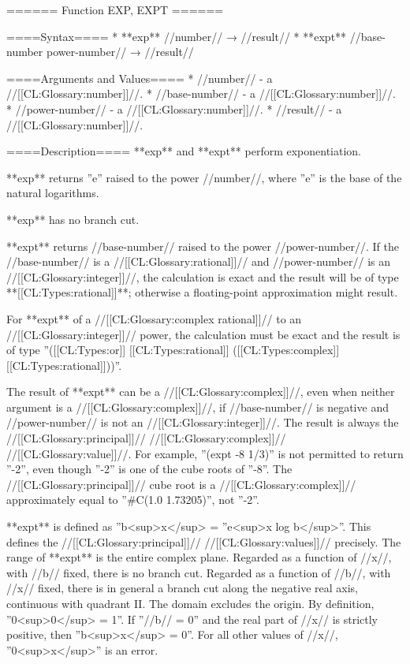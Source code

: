 ====== Function EXP, EXPT ======

====Syntax====
  * **exp** //number// → //result// 
  * **expt** //base-number power-number// → //result//

====Arguments and Values====
  * //number// - a //[[CL:Glossary:number]]//.
  * //base-number// - a //[[CL:Glossary:number]]//.
  * //power-number// - a //[[CL:Glossary:number]]//.
  * //result// - a //[[CL:Glossary:number]]//.

====Description====
**exp** and **expt** perform exponentiation.

**exp** returns ''e'' raised to the power //number//, where ''e'' is the base of the natural logarithms.

**exp** has no branch cut.

**expt** returns //base-number// raised to the power //power-number//. If the //base-number// is a //[[CL:Glossary:rational]]// and //power-number// is an //[[CL:Glossary:integer]]//, the calculation is exact and the result will be of type **[[CL:Types:rational]]**; otherwise a floating-point approximation might result.

For **expt** of a //[[CL:Glossary:complex rational]]// to an //[[CL:Glossary:integer]]// power, the calculation must be exact and the result is of type ''([[CL:Types:or]] [[CL:Types:rational]] ([[CL:Types:complex]] [[CL:Types:rational]]))''.

The result of **expt** can be a //[[CL:Glossary:complex]]//, even when neither argument is a //[[CL:Glossary:complex]]//, if //base-number// is negative and //power-number// is not an //[[CL:Glossary:integer]]//. The result is always the //[[CL:Glossary:principal]]// //[[CL:Glossary:complex]]// //[[CL:Glossary:value]]//. For example, ''(expt -8 1/3)'' is not permitted to return ''-2'', even though ''-2'' is one of the cube roots of ''-8''. The //[[CL:Glossary:principal]]// cube root is a //[[CL:Glossary:complex]]// approximately equal to ''#C(1.0 1.73205)'', not ''-2''.

**expt** is defined as ''b<sup>x</sup> = ''e<sup>x log b</sup>''. This defines the //[[CL:Glossary:principal]]// //[[CL:Glossary:values]]// precisely. The range of **expt** is the entire complex plane. Regarded as a function of //x//, with //b// fixed, there is no branch cut. Regarded as a function of //b//, with //x// fixed, there is in general a branch cut along the negative real axis, continuous with quadrant II. The domain excludes the origin. By definition, ''0<sup>0</sup> = 1''. If ''//b// = 0'' and the real part of //x// is strictly positive, then ''b<sup>x</sup> = 0''. For all other values of //x//, ''0<sup>x</sup>'' is an error.

